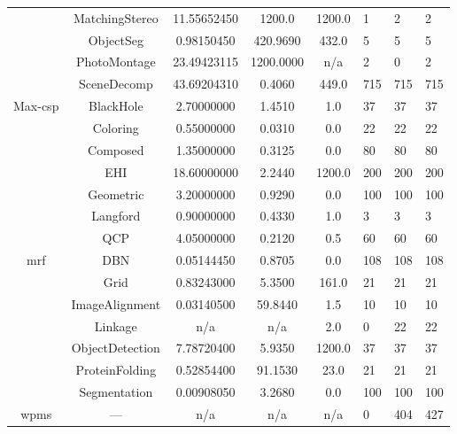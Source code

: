 \begin{table}
\begin{tabu}{ccS[round-mode=places,round-precision=3]
					  S[round-mode=places,round-precision=0]
					  S[round-mode=places,round-precision=0]HHH}
	&	MatchingStereo\textdagger	&	11.55652450	&	1200.0	&	1200.0	&	1	&	2	&	2 \\
				&	ObjectSeg	&	0.98150450	&	420.9690	&	432.0	&	5	&	5	&	5 \\
				&	PhotoMontage	&	23.49423115	&	1200.0000	&	{n/a}	&	2	&	0	&	2 \\
				&	SceneDecomp	&	43.69204310	&	0.4060	&	449.0	&	715	&	715	&	715 \\
			Max-\acrshort{csp}	&	BlackHole	&	2.70000000	&	1.4510	&	1.0	&	37	&	37	&	37 \\
				&	Coloring	&	0.55000000	&	0.0310	&	0.0	&	22	&	22	&	22 \\
				&	Composed	&	1.35000000	&	0.3125	&	0.0	&	80	&	80	&	80 \\
				&	EHI	&	18.60000000	&	2.2440	&	1200.0	&	200	&	200	&	200 \\
				&	Geometric	&	3.20000000	&	0.9290	&	0.0	&	100	&	100	&	100 \\
				&	Langford	&	0.90000000	&	0.4330	&	1.0	&	3	&	3	&	3 \\
				&	QCP	&	4.05000000	&	0.2120	&	0.5	&	60	&	60	&	60 \\
			\acrshort{mrf}	&	DBN	&	0.05144450	&	0.8705	&	0.0	&	108	&	108	&	108 \\
				&	Grid	&	0.83243000	&	5.3500	&	161.0	&	21	&	21	&	21 \\
	&	ImageAlignment	&	0.03140500	&	59.8440	&	1.5	&	10	&	10	&	10 \\
	&	Linkage	&	{n/a}	&	{n/a}	&	2.0	&	0	&	22	&	22 \\
				&	ObjectDetection	&	7.78720400	&	5.9350	&	1200.0	&	37	&	37	&	37 \\
	&	ProteinFolding	&	0.52854400	&	91.1530	&	23.0	&	21	&	21	&	21 \\
				&	Segmentation	&	0.00908050	&	3.2680	&	0.0	&	100	&	100	&	100 \\
	\acrshort{wpms}	&	---	&	{n/a}	&	{n/a}	&	{n/a}	&	0	&	404	&	427 \\
		\bottomrule
	\end{tabu}
\end{table}
